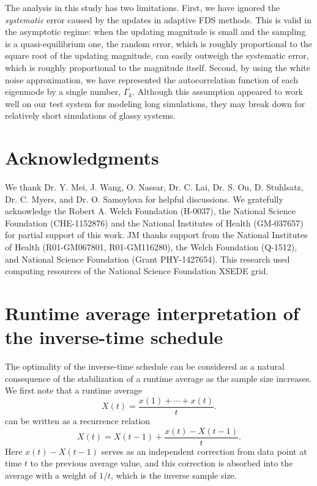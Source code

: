\documentclass[reprint, superscriptaddress, floatfix]{revtex4-1}
\begin{document}
The analysis in this study has two limitations.
%
First, we have ignored the \emph{systematic}
error\cite{zhou2005, morozov2007, zhou2008}
caused by the updates in adaptive FDS methods.
%
This is valid in the asymptotic regime:
when the updating magnitude is small
and the sampling is a quasi-equilibrium one\cite{
  zhou2005, morozov2007, zhou2008, barducci2008, dama2014},
the random error,
which is roughly proportional to
the square root of the updating magnitude\cite{
  zhou2005, morozov2007, zhou2008, bussi2006},
can easily outweigh
the systematic error,
which is roughly proportional to
the magnitude itself\cite{morozov2007}.
%
%
Second, by using the white noise approximation,
we have represented the autocorrelation function
of each eigenmode by a single number, $\Gamma_k$.
%
Although this assumption appeared to work well
on our test system for modeling long simulations,
they may break down for relatively short simulations
of glassy systems.


\section{Acknowledgments}

We thank Dr. Y. Mei, J. Wang,
O. Nassar, Dr. C. Lai, Dr. S. Ou, D. Stuhlsatz,
Dr. C. Myers, and Dr. O. Samoylova
for helpful discussions.
%
We gratefully acknowledge the Robert A. Welch Foundation (H-0037),
the National Science Foundation (CHE-1152876)
and the National Institutes of Health (GM-037657)
for partial support of this work.
%
JM thanks support from the National Institutes of Health (R01-GM067801, R01-GM116280),
the Welch Foundation (Q-1512),
and National Science Foundation (Grant PHY-1427654).
%
This research used computing resources of the National Science Foundation XSEDE grid.
%
%


\appendix




\section{\label{sec:equilerr}
Runtime average interpretation
of the inverse-time schedule
}


The optimality of the inverse-time schedule can be considered
as a natural consequence of the stabilization of a runtime average
as the sample size increases\cite{
  marsili2006, barducci2008}.
%
We first note that a runtime average
\begin{equation}
  X(t) = \frac{x(1) + \cdots + x(t)}{t}
  .
  \label{eq:avx}
\end{equation}
can be written as a recurrence relation
\begin{equation}
  X(t) = X(t - 1) + \frac{x(t) - X(t-1)}{t}
  .
  \label{eq:avx_recur}
\end{equation}
%
Here $x(t) - X(t-1)$ serves as an independent correction
from data point at time $t$ to the previous average value,
and this correction is absorbed into the average
with a weight of $1/t$,
which is the inverse sample size.
\end{document}
